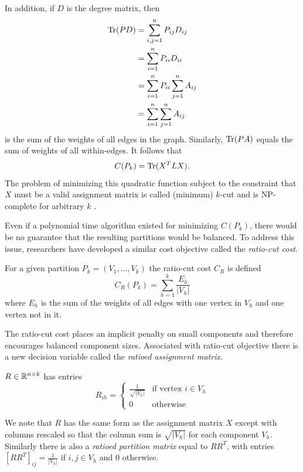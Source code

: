 In addition, if $D$ is the degree matrix, then
\begin{align*}
\operatorname{Tr}(P D) &= \sum_{i,j = 1}^n P_{ij} D_{ij} \\
         &= \sum_{i=1}^n P_{ii} D_{ii}  \\
         &= \sum_{i=1}^n P_{ii} \sum_{j=1}^n A_{ij} \\
         &= \sum_{i=1}^n \sum_{j=1}^n A_{ij}
\end{align*}
is the sum of the weights of all edges in the graph.
Similarly, $\operatorname{Tr}(P A)$ equals the sum of weights of all within-edges.
It follows that 
\[ C(P_k) = \operatorname{Tr}(X^T L X). \]
The problem of minimizing this quadratic function subject to the
constraint that $X$ must be a valid assignment matrix is called
(minimum) $k$-cut and is NP-complete for arbitrary $k$
\cite{Goldschmidt:94}.

Even if a polynomial time algorithm existed for minimizing $C(P_k)$,
there would be no guarantee that the resulting partitions would
be balanced. To address this issue, researchers have developed
a similar cost objective called the \textit{ratio-cut cost}.

\begin{definition}
 For a given partition $P_k = (V_1, ..., V_k)$ the
ratio-cut cost $C_R$ is defined
\[ C_R(P_k) = \sum_{h=1}^k \frac{E_h}{|V_h|} \]
where $E_h$ is the sum of the weights of all edges with one vertex in
$V_h$ and one vertex not in it.
\end{definition}

The ratio-cut cost places an implicit penalty on small components
and therefore encourages balanced component sizes. Associated with
ratio-cut objective there is a new decision variable called the
\textit{ratioed assignment matrix}.

\begin{definition}
 $R \in \mathbb{R}^{n \times k}$ has entries
\[ R_{ih} = \begin{cases}
		\frac{1}{\sqrt{|V_h|}} & \mbox{if vertex } i \in V_h \\
		0 & \mbox{otherwise}
\end{cases} \]
\end{definition}

We note that $R$ has the same form as the assignment matrix $X$
except with columns rescaled so that the column sum is $\sqrt{|V_h|}$
for each component $V_h$. Similarly there is also a
\textit{ratioed partition matrix} equal to $R R^T$, with entries
$[R R^T]_{ij} = \frac{1}{|V_h|}$ if $i,j \in V_h$ and 0 otherwise.


